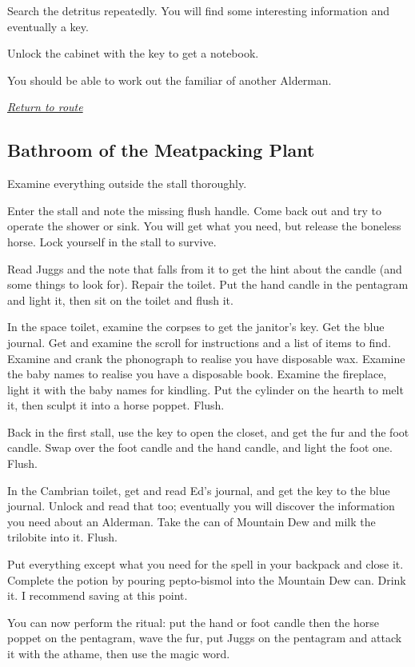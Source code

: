 \documentclass[a5paper]{extarticle}
\begin{document}
Search the detritus repeatedly. You will find some interesting information and
eventually a key.

Unlock the cabinet with the key to get a notebook.

You should be able to work out the familiar of another Alderman.

\hyperref[sec:route-3]{\emph{Return to route}}

\newpage
\subsection{Bathroom of the Meatpacking Plant}\label{sec:sol-Bathroom-of-the-Meatpacking-Plant}

Examine everything outside the stall thoroughly.

Enter the stall and note the missing flush handle.
Come back out and try to operate the shower or sink.
You will get what you need, but release the boneless horse.
Lock yourself in the stall to survive.

Read Juggs and the note that falls from it to get the hint about the candle
(and some things to look for). Repair the toilet.
Put the hand candle in the pentagram and light it,
then sit on the toilet and flush it.

In the space toilet, examine the corpses to get the janitor's key.
Get the blue journal.
Get and examine the scroll for instructions and a list of items to find.
Examine and crank the phonograph to realise you have disposable wax.
Examine the baby names to realise you have a disposable book.
Examine the fireplace, light it with the baby names for kindling.
Put the cylinder on the hearth to melt it, then sculpt it into a horse poppet.
Flush.

Back in the first stall, use the key to open the closet,
and get the fur and the foot candle.
Swap over the foot candle and the hand candle, and light the foot one.
Flush.

In the Cambrian toilet, get and read Ed's journal,
and get the key to the blue journal.
Unlock and read that too;
eventually you will discover the information you need about an Alderman.
Take the can of Mountain Dew and milk the trilobite into it.
Flush.

Put everything except what you need for the spell in your backpack and close it.
Complete the potion by pouring pepto-bismol into the Mountain Dew can. Drink it.
I recommend saving at this point.

You can now perform the ritual:
put the hand or foot candle then the horse poppet on the pentagram,
wave the fur,
put Juggs on the pentagram and attack it with the athame,
then use the magic word.
\end{document}
